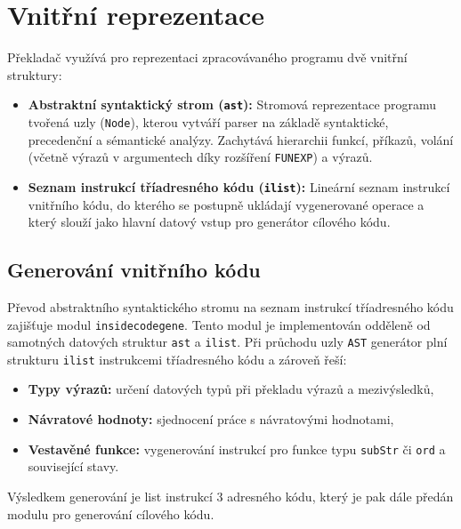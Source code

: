 \section{Vnitřní reprezentace}

Překladač využívá pro reprezentaci zpracovávaného programu dvě vnitřní struktury:
\begin{itemize}
    \item \textbf{Abstraktní syntaktický strom (\texttt{ast}):} Stromová reprezentace programu tvořená uzly (\texttt{Node}), kterou vytváří parser na základě syntaktické, precedenční a sémantické analýzy. Zachytává hierarchii funkcí, příkazů, volání (včetně výrazů v argumentech díky rozšíření \texttt{FUNEXP}) a výrazů.
    \item \textbf{Seznam instrukcí tříadresného kódu (\texttt{ilist}):} Lineární seznam instrukcí vnitřního kódu, do kterého se postupně ukládají vygenerované operace a který slouží jako hlavní datový vstup pro generátor cílového kódu.
\end{itemize}

\subsection{Generování vnitřního kódu}
Převod abstraktního syntaktického stromu na seznam instrukcí tříadresného kódu zajišťuje modul \texttt{insidecodegene}. Tento modul je implementován odděleně od samotných datových struktur \texttt{ast} a \texttt{ilist}.
   Při průchodu uzly \texttt{AST} generátor plní strukturu \texttt{ilist} instrukcemi tříadresného kódu a zároveň řeší:
\begin{itemize}
    \item \textbf{Typy výrazů:} určení datových typů při překladu výrazů a mezivýsledků,
    \item \textbf{Návratové hodnoty:} sjednocení práce s návratovými hodnotami,
    \item \textbf{Vestavěné funkce:} vygenerování instrukcí pro funkce typu \texttt{subStr} či \texttt{ord} a související stavy.
\end{itemize}
    

Výsledkem generování je list instrukcí 3 adresného kódu, který je pak dále předán modulu pro generování cílového kódu. 